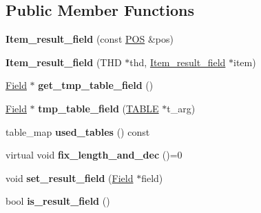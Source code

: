 \subsection*{Public Member Functions}
\begin{DoxyCompactItemize}
\item 
\mbox{\label{classItem__result__field_a2cd6ddad67b6cc35c52d38c59889d71b}} 
{\bfseries Item\+\_\+result\+\_\+field} (const \mbox{\hyperlink{structYYLTYPE}{P\+OS}} \&pos)
\item 
\mbox{\label{classItem__result__field_a4a86a61d630c9828cfc2f5401a734ab3}} 
{\bfseries Item\+\_\+result\+\_\+field} (T\+HD $\ast$thd, \mbox{\hyperlink{classItem__result__field}{Item\+\_\+result\+\_\+field}} $\ast$item)
\item 
\mbox{\label{classItem__result__field_af9a3e13e61e4f570079d1890e6abcef4}} 
\mbox{\hyperlink{classField}{Field}} $\ast$ {\bfseries get\+\_\+tmp\+\_\+table\+\_\+field} ()
\item 
\mbox{\label{classItem__result__field_a419c8d881bf8e8bf9865c0a8fce6f7b1}} 
\mbox{\hyperlink{classField}{Field}} $\ast$ {\bfseries tmp\+\_\+table\+\_\+field} (\mbox{\hyperlink{structTABLE}{T\+A\+B\+LE}} $\ast$t\+\_\+arg)
\item 
\mbox{\label{classItem__result__field_a1c95c3356dea9236b811dc8c5762b515}} 
table\+\_\+map {\bfseries used\+\_\+tables} () const
\item 
\mbox{\label{classItem__result__field_adfc419b09da6bf54495a0fb73ad2fc71}} 
virtual void {\bfseries fix\+\_\+length\+\_\+and\+\_\+dec} ()=0
\item 
\mbox{\label{classItem__result__field_af67ad530e03c4a4fd6b77b3f9a9da552}} 
void {\bfseries set\+\_\+result\+\_\+field} (\mbox{\hyperlink{classField}{Field}} $\ast$field)
\item 
\mbox{\label{classItem__result__field_a6dbcf98ce3ac4d133c9fcddf2cbffd63}} 
bool {\bfseries is\+\_\+result\+\_\+field} ()
\item 
\mbox{\label{classItem__result__field_acfc5d03a75e3a3ead6537e92f8ab654f}} 

\end{DoxyCompactItemize}
